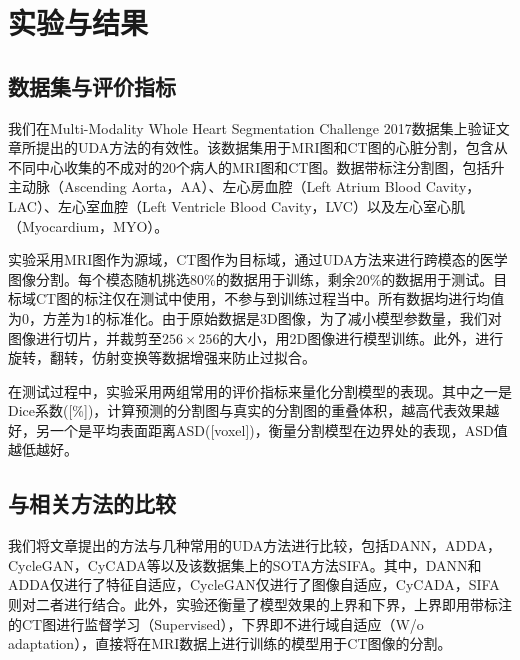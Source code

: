 \chapter{实验与结果}
\label{cha:experiment}

\section{数据集与评价指标}
我们在Multi-Modality Whole Heart Segmentation Challenge 2017数据集\cite{zhuang2016multi}上验证文章所提出的UDA方法的有效性。该数据集用于MRI图和CT图的心脏分割，包含从不同中心收集的不成对的20个病人的MRI图和CT图。数据带标注分割图，包括升主动脉（Ascending Aorta，AA）、左心房血腔（Left Atrium Blood Cavity，LAC）、左心室血腔（Left Ventricle Blood Cavity，LVC）以及左心室心肌（Myocardium，MYO）。

实验采用MRI图作为源域，CT图作为目标域，通过UDA方法来进行跨模态的医学图像分割。每个模态随机挑选80\%的数据用于训练，剩余20\%的数据用于测试。目标域CT图的标注仅在测试中使用，不参与到训练过程当中。所有数据均进行均值为0，方差为1的标准化。由于原始数据是3D图像，为了减小模型参数量，我们对图像进行切片，并裁剪至$256\times 256$的大小，用2D图像进行模型训练。此外，进行旋转，翻转，仿射变换等数据增强来防止过拟合。

在测试过程中，实验采用两组常用的评价指标来量化分割模型的表现。其中之一是Dice系数([\%])，计算预测的分割图与真实的分割图的重叠体积，越高代表效果越好，另一个是平均表面距离ASD([voxel])，衡量分割模型在边界处的表现，ASD值越低越好。

\section{与相关方法的比较}
我们将文章提出的方法与几种常用的UDA方法进行比较，包括DANN，ADDA，CycleGAN，CyCADA等以及该数据集上的SOTA方法SIFA。其中，DANN和ADDA仅进行了特征自适应，CycleGAN仅进行了图像自适应，CyCADA，SIFA则对二者进行结合。此外，实验还衡量了模型效果的上界和下界，上界即用带标注的CT图进行监督学习（Supervised），下界即不进行域自适应（W/o adaptation），直接将在MRI数据上进行训练的模型用于CT图像的分割。

